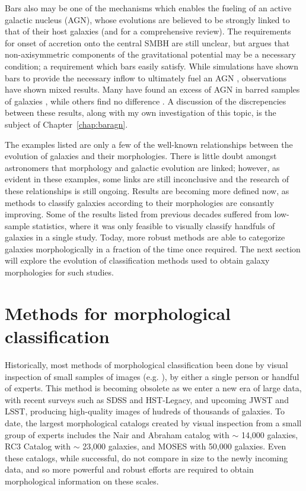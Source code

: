 Bars also may be one of the mechanisms which enables the fueling of an active galactic nucleus (AGN), whose evolutions are believed to be strongly linked to that of their host galaxies \citep{Schawinski2007, Schawinski2010, Antonini2015, Yang2017, Zubovas2017} (and \citet{Heckman2014} for a comprehensive review). The requirements for onset of accretion onto the central SMBH are still unclear, but \citet{Moles1995} argues that non-axisymmetric components of the gravitational potential may be a necessary condition; a requirement which bars easily satisfy. While simulations have shown bars to provide the necessary inflow to ultimately fuel an AGN \citep{Athanassoula1992,Friedli1993}, observations have shown mixed results. Many have found an excess of AGN in barred samples of galaxies \citep{Knapen2000,Oh2012}, while others find no difference \citep{Ho1997,Mulchaey1997,Cheung2015}. A discussion of the discrepencies between these results, along with my own investigation of this topic, is the subject of Chapter~\ref{chap:baragn}. 

The examples listed are only a few of the well-known relationships between the evolution of galaxies and their morphologies. There is little doubt amongst astronomers that morphology and galactic evolution are linked; however, as evident in these examples, some links are still inconclusive and the research of these relationships is still ongoing. Results are becoming more defined now, as methods to classify galaxies according to their morphologies are consantly improving. Some of the results listed from previous decades suffered from low-sample statistics, where it was only feasible to visually classify handfuls of galaxies in a single study. Today, more robust methods are able to categorize galaxies morphologically in a fraction of the time once required. The next section will explore the evolution of classification methods used to obtain galaxy morphologies for such studies. 


\section{Methods for morphological classification}

Historically, most methods of morphological classification been done by visual inspection of small samples of images (e.g. \citet{Hubble1926,Sandage1961,DeVaucouleurs1963,Block1994,Eskridge2002,Buta2010}), by either a single person or handful of experts. This method is becoming obsolete as we enter a new era of large data, with recent surveys such as SDSS and HST-Legacy, and upcoming JWST and LSST, producing high-quality images of hudreds of thousands of galaxies. To date, the largest morphological catalogs created by visual inspection from a small group of experts includes the Nair and Abraham catalog \citep{Nair2010} with $\sim$ 14,000 galaxies, RC3 Catalog \citep{RC31991} with $\sim$ 23,000 galaxies, and MOSES \citep{Schawinski2007} with 50,000 galaxies. Even these catalogs, while successful, do not compare in size to the newly incoming data, and so more powerful and robust efforts are required to obtain morphological information on these scales.

